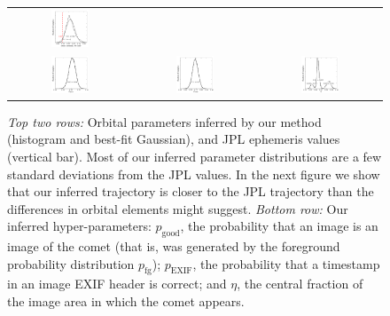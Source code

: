 \documentclass[12pt,preprint]{aastex}
\newcommand{\pgood}{p_\mathrm{good}}
\newcommand{\exif}{\mathrm{EXIF}}
\newcommand{\pexif}{p_\exif}
\newcommand{\pfg}{p_\mathrm{fg}}
\begin{document}
\begin{figure}
\begin{center}
\begin{tabular}{@{}c@{}c@{}c@{}}
\includegraphics[width=0.33\textwidth]{param-hist-5} \\
\includegraphics[width=0.33\textwidth]{hparam-hist-0} &
\includegraphics[width=0.33\textwidth]{hparam-hist-1} &
\includegraphics[width=0.33\textwidth]{hparam-hist-2}
\end{tabular}
\end{center}
\caption{\textsl{Top two rows:} Orbital parameters inferred by our
  method (histogram and best-fit Gaussian), and JPL ephemeris values
  (vertical bar).  Most of our inferred parameter distributions are a
  few standard deviations from the JPL values.  In the next figure we
  show that our inferred trajectory is closer to the JPL trajectory
  than the differences in orbital elements might suggest.
  \textsl{Bottom row:} Our inferred hyper-parameters: $\pgood$, the
  probability that an image is an image of the comet (that is, was
  generated by the foreground probability distribution $\pfg$);
  $\pexif$, the probability that a timestamp in an image EXIF header
  is correct; and $\eta$, the central fraction of the image area in
  which the comet appears.
  \label{fig:param-hists}}
\end{figure}
\end{document}
